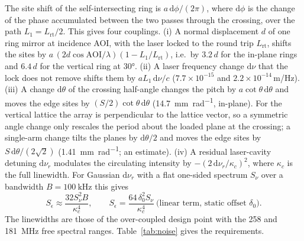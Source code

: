 \documentclass[11pt]{article}
\begin{document}
The site shift of the self-intersecting ring is $a\,\mathrm{d}\phi/(2\pi)$, where $\mathrm{d}\phi$ is the
change of the phase accumulated between the two passes through the crossing, over the path
$L_1 = L_\mathrm{rt}/2$. This gives four couplings. (i) A normal displacement $d$ of one ring mirror at
incidence AOI, with the laser locked to the round trip $L_\mathrm{rt}$, shifts the sites by
$a\,(2 d \cos\mathrm{AOI}/\lambda)(1 - L_1/L_\mathrm{rt})$, i.e.\ by $3.2\,d$ for the in-plane rings and
$6.4\,d$ for the vertical ring at \ang{30}. (ii) A laser frequency change $\mathrm{d}\nu$ that the lock
does not remove shifts them by $a L_1\,\mathrm{d}\nu/c$ ($7.7\times10^{-15}$ and
$2.2\times10^{-14}$\,m/Hz). (iii) A change $\mathrm{d}\theta$ of the crossing half-angle changes the pitch
by $a\cot\theta\,\mathrm{d}\theta$ and moves the edge sites by $(S/2)\cot\theta\,\mathrm{d}\theta$
(\SI{14.7}{\milli\metre\per\radian}, in-plane). For the vertical lattice the array is perpendicular to the
lattice vector, so a symmetric angle change only rescales the period about the loaded plane at the
crossing; a single-arm change tilts the planes by $\mathrm{d}\theta/2$ and moves the edge sites by
$S\,\mathrm{d}\theta/(2\sqrt{2})$ (\SI{1.41}{\milli\metre\per\radian}; an estimate). (iv) A residual laser-cavity detuning $\mathrm{d}\nu_r$ modulates
the circulating intensity by $-(2\,\mathrm{d}\nu_r/\kappa_c)^{2}$, where $\kappa_c$ is the full linewidth.
For Gaussian $\mathrm{d}\nu_r$ with a flat one-sided spectrum $S_\nu$ over a bandwidth
$B = \SI{100}{\kilo\hertz}$ this gives
\begin{equation}
  S_\epsilon \approx \frac{32 S_\nu^{2} B}{\kappa_c^{4}}, \qquad
  S_\epsilon = \frac{64\,\delta_0^{2} S_\nu}{\kappa_c^{4}}\ \text{(linear term, static offset $\delta_0$)}.
  \label{eq:lock}
\end{equation}
The linewidths are those of the over-coupled design point with the 258 and \SI{181}{\mega\hertz} free
spectral ranges. Table~\ref{tab:noise} gives the requirements.
\end{document}
